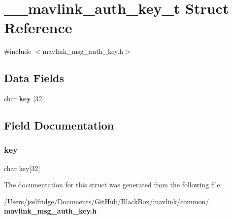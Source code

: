 \section{\+\_\+\+\_\+mavlink\+\_\+auth\+\_\+key\+\_\+t Struct Reference}
\label{struct____mavlink__auth__key__t}


{\ttfamily \#include $<$mavlink\+\_\+msg\+\_\+auth\+\_\+key.\+h$>$}

\subsection*{Data Fields}
\begin{DoxyCompactItemize}
\item 
char \textbf{ key} [32]
\end{DoxyCompactItemize}


\subsection{Field Documentation}
\mbox{\label{struct____mavlink__auth__key__t_aba8ec8b73c06b7c981b67e88184a1d08}} 
\subsubsection{key}
{\footnotesize\ttfamily char key[32]}



The documentation for this struct was generated from the following file\+:\begin{DoxyCompactItemize}
\item 
/\+Users/jselfridge/\+Documents/\+Git\+Hub/\+Black\+Box/mavlink/common/\textbf{ mavlink\+\_\+msg\+\_\+auth\+\_\+key.\+h}\end{DoxyCompactItemize}
